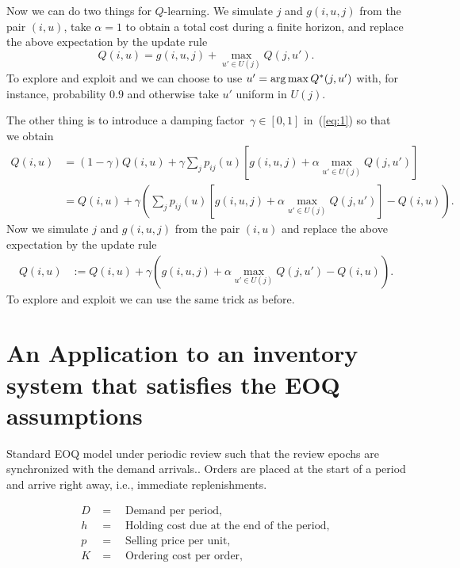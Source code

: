 \documentclass{article}
\begin{document}
Now we can do two things for $Q$-learning.  We simulate $j$ and $g(i,u,j)$ from the
pair $(i,u)$, take $\alpha=1$ to obtain a total cost during a finite horizon, and replace the above expectation by the update rule
\begin{equation*}
  Q(i,u)  = g(i,u,j) + \max_{u'\in U(j)} Q(j,u').
\end{equation*}
To explore and exploit and we can choose to use
$u' = \argmax Q^*(j,u')$ with, for instance, probability $0.9$ and
otherwise take $u'$ uniform in $U(j)$.

The other thing is to introduce a damping factor~$\gamma\in[0,1]$ in~(\ref{eq:1}) so that we obtain 
\begin{equation*}
  \begin{split}
  Q(i,u) 
&=  (1-\gamma)Q(i,u) + \gamma \sum_{j} p_{ij}(u) \left[g(i,u,j) + \alpha \max_{u'\in U(j)} Q(j,u')\right] \\
&=  Q(i,u) + \gamma \left(\sum_{j} p_{ij}(u) \left[g(i,u,j) + \alpha \max_{u'\in U(j)} Q(j,u')\right] - Q(i,u)\right).
  \end{split}
\end{equation*}
Now we simulate $j$ and $g(i,u,j)$ from the
pair $(i,u)$ and replace the above expectation by the update rule
\begin{equation}\label{eq:3}
  \begin{split}
  Q(i,u) 
&:=  Q(i,u) + \gamma \left(g(i,u,j) + \alpha \max_{u'\in U(j)} Q(j,u')- Q(i,u)\right).
  \end{split}
\end{equation}
To explore and exploit  we can use the same trick as before.

\section{An Application to an inventory system that satisfies the EOQ assumptions}


Standard EOQ model under periodic review such that the review epochs are synchronized with the demand arrivals.. Orders are placed at the
start of a period and arrive right away, i.e., immediate replenishments.

\begin{align*}
  D&= \quad \text{Demand per period},\\
  h&= \quad \text{Holding cost due at the end of the period},\\
  p&= \quad \text{Selling price per unit},\\
  K&= \quad \text{Ordering cost per order},\\
\end{align*}
\end{document}
